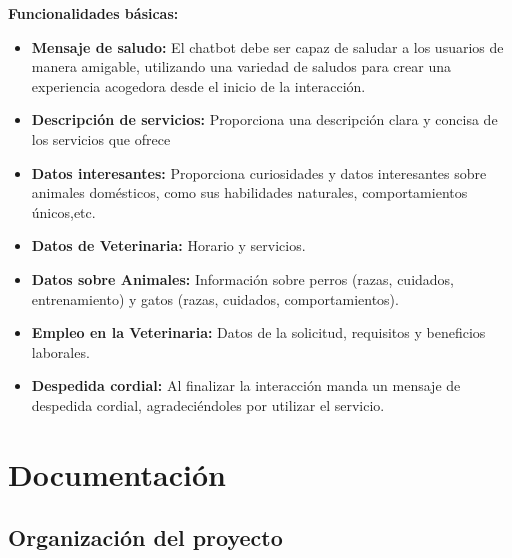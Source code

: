 \documentclass[a4paper,12pt]{article}
\begin{document}
\textbf{Funcionalidades básicas:}
\begin{itemize}
    \item \textbf{Mensaje de saludo:} El chatbot debe ser capaz de saludar a los usuarios de manera amigable, utilizando una variedad de saludos para crear una experiencia acogedora desde el inicio de la interacción.
    
    \item \textbf{Descripción de servicios:} Proporciona una descripción clara y concisa de los servicios que ofrece 

    \item \textbf{Datos interesantes:} Proporciona curiosidades y datos interesantes sobre animales domésticos, como sus habilidades naturales, comportamientos únicos,etc.
   
    \item  \textbf{Datos de Veterinaria:} Horario y servicios.

    \item  \textbf{Datos sobre Animales:} Información sobre perros (razas, cuidados, entrenamiento) y gatos (razas, cuidados, comportamientos).
    
    \item  \textbf{Empleo en la Veterinaria:} Datos de la solicitud, requisitos y beneficios laborales.
    
    \item \textbf{Despedida cordial:} Al finalizar la interacción manda un mensaje de despedida cordial, agradeciéndoles por utilizar el servicio.
\end{itemize}


\section{Documentación}

\subsection{Organización del proyecto}
\end{document}
